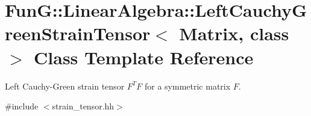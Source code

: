 \hypertarget{classFunG_1_1LinearAlgebra_1_1LeftCauchyGreenStrainTensor}{\section{\-Fun\-G\-:\-:\-Linear\-Algebra\-:\-:\-Left\-Cauchy\-Green\-Strain\-Tensor$<$ \-Matrix, class $>$ \-Class \-Template \-Reference}
\label{classFunG_1_1LinearAlgebra_1_1LeftCauchyGreenStrainTensor}
}


\-Left \-Cauchy-\/\-Green strain tensor $ F^T F $ for a symmetric matrix $ F $.  




{\ttfamily \#include $<$strain\-\_\-tensor.\-hh$>$}

